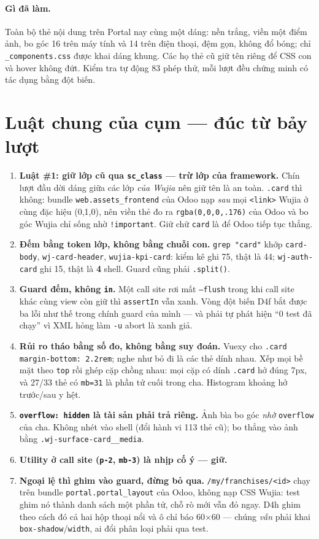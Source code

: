\paragraph{Gì đã làm.} Toàn bộ thẻ nội dung trên Portal nay cùng một dáng: nền trắng, viền một
điểm ảnh, bo góc 16 trên máy tính và 14 trên điện thoại, đệm gọn, không đổ bóng; chỉ
\texttt{\_components.css} được khai dáng khung. Các họ thẻ cũ giữ tên riêng để CSS con và hover
không đứt. Kiểm tra tự động 83 phép thử, mỗi lượt đều chứng minh có tác dụng bằng đột biến.

\section{Luật chung của cụm --- đúc từ bảy lượt}

\begin{enumerate}
\item \textbf{Luật \#1: giữ lớp cũ qua \texttt{sc\_class} --- trừ lớp của framework.} Chín lượt
  đầu dời dáng giữa các lớp \emph{của Wujia} nên giữ tên là an toàn. \texttt{.card} thì không:
  bundle \texttt{web.assets\_frontend} của Odoo nạp \emph{sau} mọi \texttt{<link>} Wujia ở cùng
  đặc hiệu (0,1,0), nên viền thẻ đo ra \texttt{rgba(0,0,0,.176)} của Odoo và bo góc Wujia chỉ
  sống nhờ \texttt{!important}. Giữ chữ \texttt{card} là để Odoo tiếp tục thắng.
\item \textbf{Đếm bằng token lớp, không bằng chuỗi con.} \texttt{grep "card"} khớp
  \texttt{card-body}, \texttt{wj-card-header}, \texttt{wujia-kpi-card}: kiểm kê ghi 75, thật là
  44; \texttt{wj-auth-card} ghi 15, thật là \textbf{4} shell. Guard cũng phải \texttt{.split()}.
\item \textbf{Guard đếm, không \texttt{in}.} Một call site rơi mất \texttt{--flush} trong khi
  call site khác cùng view còn giữ thì \texttt{assertIn} vẫn xanh. Vòng đột biến D4f bắt được
  ba lỗi như thế trong chính guard của mình --- và phải tự phát hiện ``0 test đã chạy'' vì XML
  hỏng làm \texttt{-u} abort là xanh giả.
\item \textbf{Rủi ro tháo bằng số đo, không bằng suy đoán.} Vuexy cho \texttt{.card}
  \texttt{margin-bottom: 2.2rem}; nghe như bỏ đi là các thẻ dính nhau. Xếp mọi bề mặt theo
  \texttt{top} rồi ghép cặp chồng nhau: mọi cặp có dính \texttt{.card} hở đúng 7px, và 27/33
  thẻ có \texttt{mb=31} là phần tử cuối trong cha. Histogram khoảng hở trước/sau y hệt.
\item \textbf{\texttt{overflow: hidden} là tài sản phải trả riêng.} Ảnh bìa bo góc \emph{nhờ}
  \texttt{overflow} của cha. Không nhét vào shell (đổi hành vi 113 thẻ cũ); bo thẳng vào ảnh
  bằng \texttt{.wj-surface-card\_\_media}.
\item \textbf{Utility ở call site (\texttt{p-2}, \texttt{mb-3}) là nhịp cố ý --- giữ.}
\item \textbf{Ngoại lệ thì ghim vào guard, đừng bỏ qua.} \texttt{/my/franchises/<id>} chạy trên
  bundle \texttt{portal.portal\_layout} của Odoo, không nạp CSS Wujia: test ghim nó thành danh
  sách một phần tử, chỗ rò mới vẫn đỏ ngay. D4h ghim theo cách đó cả hai hộp thoại nổi và ô chỉ
  báo 60$\times$60 --- chúng \emph{vẫn} phải khai \texttt{box-shadow}/\texttt{width}, ai đổi phân
  loại phải qua test.
\end{enumerate}

